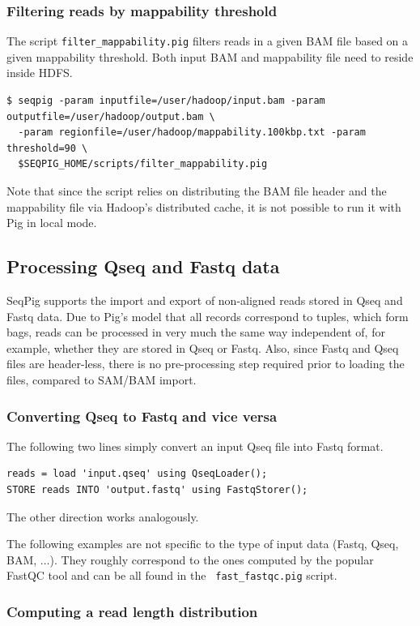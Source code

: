 \subsubsection{Filtering reads by mappability threshold}
The script {\tt filter\_mappability.pig} filters reads in a given BAM file based on a given
mappability threshold. Both input BAM and mappability file need to reside inside HDFS.
\begin{lstlisting}
$ seqpig -param inputfile=/user/hadoop/input.bam -param outputfile=/user/hadoop/output.bam \
  -param regionfile=/user/hadoop/mappability.100kbp.txt -param threshold=90 \
  $SEQPIG_HOME/scripts/filter_mappability.pig
\end{lstlisting}
Note that since the script relies on distributing the BAM file header and the
mappability file via Hadoop's distributed cache, it is not possible to run it
with Pig in local mode.

\subsection{Processing Qseq and Fastq data}

SeqPig supports the import and export of non-aligned reads stored in
Qseq and Fastq data. Due to Pig's model that all records correspond to
tuples, which form bags, reads can be processed in very much the same
way independent of, for example, whether they are stored in Qseq or
Fastq. Also, since Fastq and Qseq files are header-less, there is no
pre-processing step required prior to loading the files, compared to
SAM/BAM import.

\subsubsection{Converting Qseq to Fastq and vice versa}

The following two lines simply convert an input Qseq file into Fastq format.
\begin{lstlisting}
reads = load 'input.qseq' using QseqLoader();
STORE reads INTO 'output.fastq' using FastqStorer(); 
\end{lstlisting}
The other direction works analogously.

The following examples are not specific to the type of input data
(Fastq, Qseq, BAM, $\ldots$). They roughly correspond to the ones
computed by the popular FastQC tool and can be all found in the {\tt
  fast\_fastqc.pig} script.

\subsubsection{Computing a read length distribution}
\label{sect:read_length_dist}

